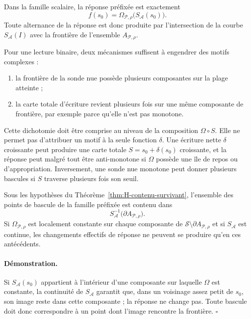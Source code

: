 Dans la famille scalaire, la réponse préfixée est exactement
\[
f(s_0)
=
\Omega_{\mathcal P,\rho}
\bigl(S_{\mathcal A}(s_0)\bigr).
\]
Toute alternance de la réponse est donc produite par l'intersection de
la courbe $S_{\mathcal A}(I)$ avec la frontière de l'ensemble
$A_{\mathcal P,\rho}$.

Pour une lecture binaire, deux mécanismes suffisent à engendrer des
motifs complexes :
\begin{enumerate}
\item la frontière de la sonde nue possède plusieurs composantes sur la
  plage atteinte ;
\item la carte totale d'écriture revient plusieurs fois sur une même
  composante de frontière, par exemple parce qu'elle n'est pas
  monotone.
\end{enumerate}

Cette dichotomie doit être comprise au niveau de la composition
$\Omega\circ S$. Elle ne permet pas d'attribuer un motif à la seule
fonction $\delta$. Une écriture nette $\delta$ croissante peut produire
une carte totale $S=s_0+\delta(s_0)$ croissante, et la réponse peut
malgré tout être anti-monotone si $\Omega$ possède une île de repos ou
d'appropriation. Inversement, une sonde nue monotone peut donner
plusieurs bascules si $S$ traverse plusieurs fois son seuil.

\begin{encadre}[title={Corollaire \theproposition{} --- Localisation exhaustive des bascules}]
Sous les hypothèses du Théorème~\ref{thm:H-contenu-survivant}, l'ensemble des points de bascule
de la famille préfixée est contenu dans
\begin{equation}
\label{eq:annexe-H-preimage-frontiere}
S_{\mathcal A}^{-1}
\bigl(\partial A_{\mathcal P,\rho}\bigr).
\end{equation}
Si $\Omega_{\mathcal P,\rho}$ est localement constante sur chaque
composante de
$\mathcal S\setminus\partial A_{\mathcal P,\rho}$ et si
$S_{\mathcal A}$ est continue, les changements effectifs de réponse ne
peuvent se produire qu'en ces antécédents.
\end{encadre}

\paragraph{Démonstration.}
Si $S_{\mathcal A}(s_0)$ appartient à l'intérieur d'une composante sur
laquelle $\Omega$ est constante, la continuité de $S_{\mathcal A}$
garantit que, dans un voisinage assez petit de $s_0$, son image reste
dans cette composante ; la réponse ne change pas. Toute bascule doit
donc correspondre à un point dont l'image rencontre la frontière.
\hfill$\square$

